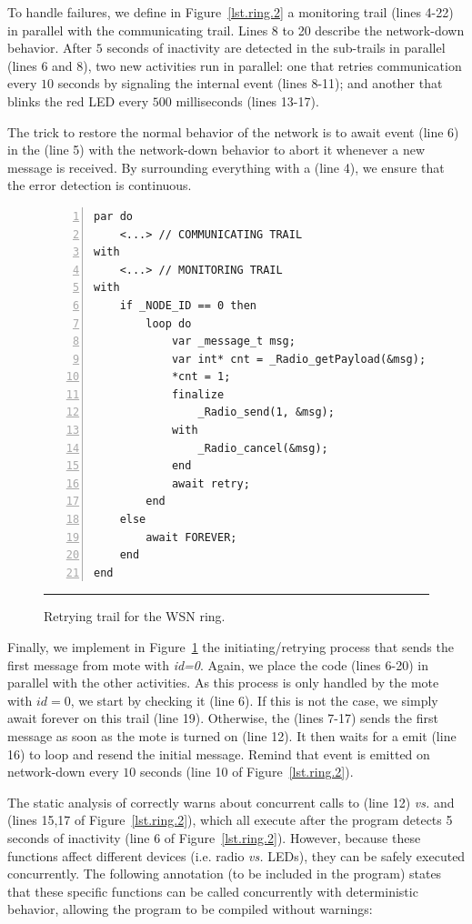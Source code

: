To handle failures, we define in Figure~\ref{lst.ring.2} a monitoring trail 
(lines 4-22) in parallel with the communicating trail.
%
Lines 8 to 20 describe the network-down behavior.
After $5$ seconds of inactivity are detected in the sub-trails in parallel 
(lines 6 and 8), two new activities run in parallel: one that retries 
communication every $10$ seconds by signaling the internal event  
(lines 8-11); and another that blinks the red LED every $500$ milliseconds 
(lines 13-17).

The trick to restore the normal behavior of the network is to await event 
 (line 6) in the  (line 5) with the 
network-down behavior to abort it whenever a new message is received.
By surrounding everything with a  (line 4), we ensure that the error 
detection is continuous.

\begin{figure}[ht]
\begin{lstlisting}[numbers=left,xleftmargin=2em]
par do
    <...> // COMMUNICATING TRAIL
with
    <...> // MONITORING TRAIL
with
    if _NODE_ID == 0 then
        loop do
            var _message_t msg;
            var int* cnt = _Radio_getPayload(&msg);
            *cnt = 1;
            finalize
                _Radio_send(1, &msg);
            with
                _Radio_cancel(&msg);
            end
            await retry;
        end
    else
        await FOREVER;
    end
end
\end{lstlisting}
\rule{14cm}{0.37pt}
\caption{ Retrying trail for the WSN ring.%
{\small %
}%
\label{lst.ring.3}
}
\end{figure}

Finally, we implement in Figure~\ref{lst.ring.3} the initiating/retrying 
process that sends the first message from mote with \emph{id=0}.
Again, we place the code (lines 6-20) in parallel with the other activities.
%
As this process is only handled by the mote with $id=0$, we start by checking 
it (line 6).
If this is not the case, we simply await forever on this trail (line 19).
Otherwise, the  (lines 7-17) sends the first message as soon as the 
mote is turned on (line 12).
It then waits for a  emit (line 16) to loop and resend the initial 
message.
Remind that event  is emitted on network-down every $10$ seconds 
(line 10 of Figure~\ref{lst.ring.2}).

The static analysis of \CEU correctly warns about concurrent calls to 
 (line 12) \emph{vs.}  and 
 (lines 15,17 of Figure~\ref{lst.ring.2}), which all 
execute after the program detects 5 seconds of inactivity (line 6 of 
Figure~\ref{lst.ring.2}).
However, because these functions affect different devices (i.e. radio 
\emph{vs.} LEDs), they can be safely executed concurrently.
The following annotation (to be included in the program) states that these 
specific functions can be called concurrently with deterministic behavior, 
allowing the program to be compiled without warnings:

